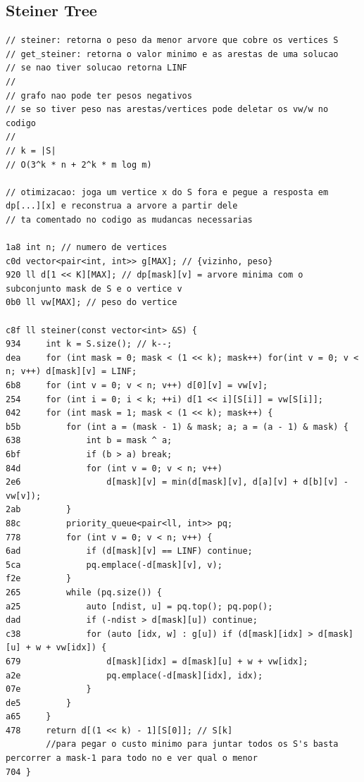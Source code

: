 \documentclass[11pt, a4paper, twoside]{article}
\begin{document}
\subsection{Steiner Tree}
\begin{lstlisting}
// steiner: retorna o peso da menor arvore que cobre os vertices S
// get_steiner: retorna o valor minimo e as arestas de uma solucao
// se nao tiver solucao retorna LINF
//
// grafo nao pode ter pesos negativos
// se so tiver peso nas arestas/vertices pode deletar os vw/w no codigo
//
// k = |S|
// O(3^k * n + 2^k * m log m)

// otimizacao: joga um vertice x do S fora e pegue a resposta em dp[...][x] e reconstrua a arvore a partir dele
// ta comentado no codigo as mudancas necessarias

1a8 int n; // numero de vertices
c0d vector<pair<int, int>> g[MAX]; // {vizinho, peso}
920 ll d[1 << K][MAX]; // dp[mask][v] = arvore minima com o subconjunto mask de S e o vertice v
0b0 ll vw[MAX]; // peso do vertice

c8f ll steiner(const vector<int> &S) {
934 	int k = S.size(); // k--;
dea 	for (int mask = 0; mask < (1 << k); mask++) for(int v = 0; v < n; v++) d[mask][v] = LINF;
6b8 	for (int v = 0; v < n; v++) d[0][v] = vw[v];
254 	for (int i = 0; i < k; ++i) d[1 << i][S[i]] = vw[S[i]];
042 	for (int mask = 1; mask < (1 << k); mask++) {
b5b 		for (int a = (mask - 1) & mask; a; a = (a - 1) & mask) {
638 			int b = mask ^ a;
6bf 			if (b > a) break;
84d 			for (int v = 0; v < n; v++)
2e6 				d[mask][v] = min(d[mask][v], d[a][v] + d[b][v] - vw[v]);
2ab 		}
88c 		priority_queue<pair<ll, int>> pq;
778 		for (int v = 0; v < n; v++) {
6ad 			if (d[mask][v] == LINF) continue;
5ca 			pq.emplace(-d[mask][v], v);
f2e 		}
265 		while (pq.size()) {
a25 			auto [ndist, u] = pq.top(); pq.pop();
dad 			if (-ndist > d[mask][u]) continue;
c38 			for (auto [idx, w] : g[u]) if (d[mask][idx] > d[mask][u] + w + vw[idx]) {
679 				d[mask][idx] = d[mask][u] + w + vw[idx];
a2e 				pq.emplace(-d[mask][idx], idx);
07e 			}
de5 		}
a65 	}
478 	return d[(1 << k) - 1][S[0]]; // S[k]
        //para pegar o custo minimo para juntar todos os S's basta percorrer a mask-1 para todo no e ver qual o menor
704 }


\end{lstlisting}
\end{document}
